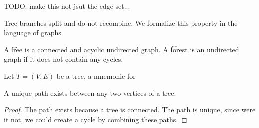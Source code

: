 
TODO: make this not jsut the edge set...

Tree branches split and do not recombine.
We formalize this property in the language of graphs.


A \t{tree} is a connected and acyclic undirected graph.
A \t{forest} is an undirected graph if it does not contain any cycles.




Let $T = (V, E)$ be a tree, a mnemonic for 
%

%
%

\begin{prop}

A unique path exists between any two vertices of a tree.

\begin{proof}
The path exists because a tree is connected.
The path is unique, since were it not, we could create a cycle by combining these paths.
\end{proof}

\end{prop}
